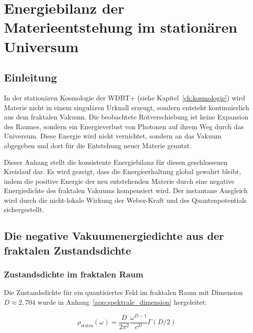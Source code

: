 
\chapter{Energiebilanz der Materieentstehung im stationären Universum}
\label{app:materieentstehung}

\section{Einleitung}
\label{app:materieentstehung_einleitung}

In der stationären Kosmologie der WDBT+ (siehe Kapitel~\ref{ch:kosmologie}) wird Materie nicht in einem singulären Urknall erzeugt, sondern entsteht kontinuierlich aus dem fraktalen Vakuum. Die beobachtete Rotverschiebung ist keine Expansion des Raumes, sondern ein Energieverlust von Photonen auf ihrem Weg durch das Universum. Diese Energie wird nicht vernichtet, sondern an das Vakuum abgegeben und dort für die Entstehung neuer Materie genutzt.

Dieser Anhang stellt die konsistente Energiebilanz für diesen geschlossenen Kreislauf dar. Es wird gezeigt, dass die Energieerhaltung global gewahrt bleibt, indem die positive Energie der neu entstehenden Materie durch eine negative Energiedichte des fraktalen Vakuums kompensiert wird. Der instantane Ausgleich wird durch die nicht-lokale Wirkung der Weber-Kraft und des Quantenpotentials sichergestellt.

\section{Die negative Vakuumenergiedichte aus der fraktalen Zustandsdichte}
\label{app:materieentstehung_vakuum}

\subsection{Zustandsdichte im fraktalen Raum}
\label{sub:materieentstehung_zustandsdichte}

Die Zustandsdichte für ein quantisiertes Feld im fraktalen Raum mit Dimension \( D \approx 2,704 \) wurde in Anhang~\ref{app:spektrale_dimension} hergeleitet:

\[
\rho_{\text{states}}(\omega) = \frac{D}{2\pi^2} \frac{\omega^{D-1}}{c^D} \Gamma(D/2)
\]

